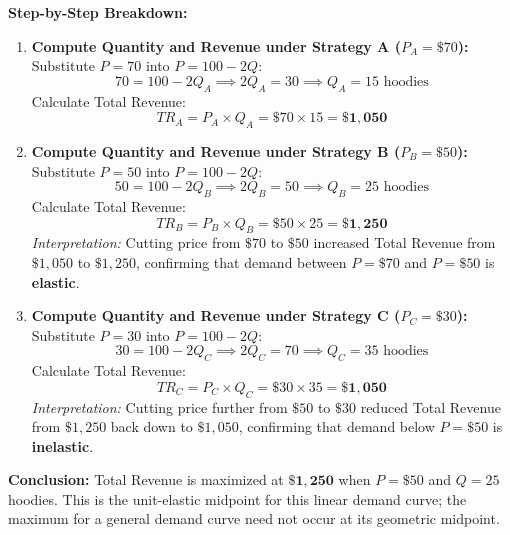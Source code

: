 \documentclass[11pt,letterpaper]{article}
\begin{document}
\noindent\textbf{Step-by-Step Breakdown:}
\begin{enumerate}
    \item \textbf{Compute Quantity and Revenue under Strategy A ($P_A = \$70$):}
    Substitute $P = 70$ into $P = 100 - 2Q$:
    \[
    70 = 100 - 2Q_A \implies 2Q_A = 30 \implies Q_A = 15\text{ hoodies}
    \]
    Calculate Total Revenue:
    \[
    TR_A = P_A \times Q_A = \$70 \times 15 = \mathbf{\$1{,}050}
    \]

    \item \textbf{Compute Quantity and Revenue under Strategy B ($P_B = \$50$):}
    Substitute $P = 50$ into $P = 100 - 2Q$:
    \[
    50 = 100 - 2Q_B \implies 2Q_B = 50 \implies Q_B = 25\text{ hoodies}
    \]
    Calculate Total Revenue:
    \[
    TR_B = P_B \times Q_B = \$50 \times 25 = \mathbf{\$1{,}250}
    \]
    \emph{Interpretation:} Cutting price from $\$70$ to $\$50$ increased Total Revenue from $\$1{,}050$ to $\$1{,}250$, confirming that demand between $P=\$70$ and $P=\$50$ is \textbf{elastic}.

    \item \textbf{Compute Quantity and Revenue under Strategy C ($P_C = \$30$):}
    Substitute $P = 30$ into $P = 100 - 2Q$:
    \[
    30 = 100 - 2Q_C \implies 2Q_C = 70 \implies Q_C = 35\text{ hoodies}
    \]
    Calculate Total Revenue:
    \[
    TR_C = P_C \times Q_C = \$30 \times 35 = \mathbf{\$1{,}050}
    \]
    \emph{Interpretation:} Cutting price further from $\$50$ to $\$30$ reduced Total Revenue from $\$1{,}250$ back down to $\$1{,}050$, confirming that demand below $P=\$50$ is \textbf{inelastic}.
\end{enumerate}
\textbf{Conclusion:} Total Revenue is maximized at $\mathbf{\$1{,}250}$ when $P = \$50$ and $Q = 25$ hoodies. This is the unit-elastic midpoint for this linear demand curve; the maximum for a general demand curve need not occur at its geometric midpoint.
\end{document}
